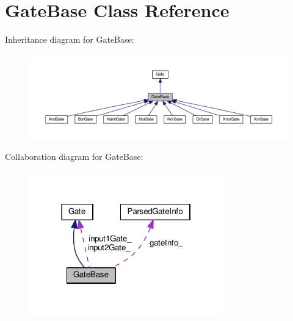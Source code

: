 \hypertarget{classGateBase}{}\section{Gate\+Base Class Reference}
\label{classGateBase}


Inheritance diagram for Gate\+Base\+:
\nopagebreak
\begin{figure}[H]
\begin{center}
\leavevmode
\includegraphics[width=350pt]{classGateBase__inherit__graph}
\end{center}
\end{figure}


Collaboration diagram for Gate\+Base\+:
\nopagebreak
\begin{figure}[H]
\begin{center}
\leavevmode
\includegraphics[width=238pt]{classGateBase__coll__graph}
\end{center}
\end{figure}
